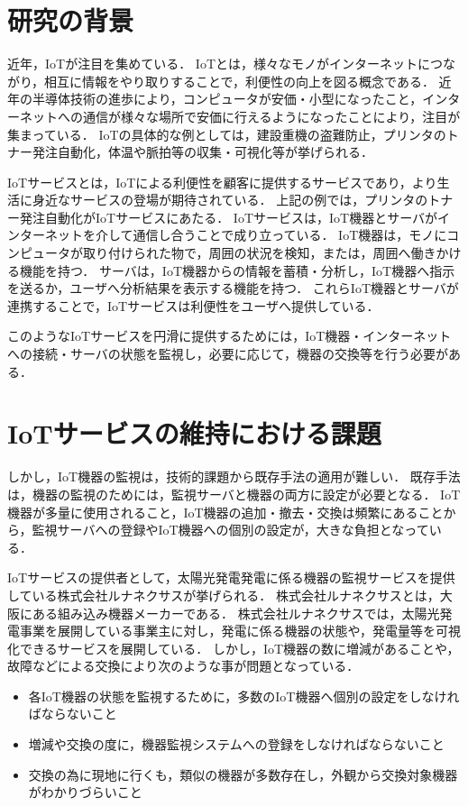 \section{研究の背景}
近年，IoTが注目を集めている．
IoTとは，様々なモノがインターネットにつながり，相互に情報をやり取りすることで，利便性の向上を図る概念である．
近年の半導体技術の進歩により，コンピュータが安価・小型になったこと，インターネットへの通信が様々な場所で安価に行えるようになったことにより，注目が集まっている．
IoTの具体的な例としては，建設重機の盗難防止，プリンタのトナー発注自動化，体温や脈拍等の収集・可視化等が挙げられる．
\medskip

IoTサービスとは，IoTによる利便性を顧客に提供するサービスであり，より生活に身近なサービスの登場が期待されている．
上記の例では，プリンタのトナー発注自動化がIoTサービスにあたる．
IoTサービスは，IoT機器とサーバがインターネットを介して通信し合うことで成り立っている．
IoT機器は，モノにコンピュータが取り付けられた物で，周囲の状況を検知，または，周囲へ働きかける機能を持つ．
サーバは，IoT機器からの情報を蓄積・分析し，IoT機器へ指示を送るか，ユーザへ分析結果を表示する機能を持つ．
これらIoT機器とサーバが連携することで，IoTサービスは利便性をユーザへ提供している．
\medskip

このようなIoTサービスを円滑に提供するためには，IoT機器・インターネットへの接続・サーバの状態を監視し，必要に応じて，機器の交換等を行う必要がある．

\section{IoTサービスの維持における課題}
しかし，IoT機器の監視は，技術的課題から既存手法の適用が難しい．
既存手法は，機器の監視のためには，監視サーバと機器の両方に設定が必要となる．
IoT機器が多量に使用されること，IoT機器の追加・撤去・交換は頻繁にあることから，監視サーバへの登録やIoT機器への個別の設定が，大きな負担となっている．
\medskip

IoTサービスの提供者として，太陽光発電発電に係る機器の監視サービスを提供している株式会社ルナネクサスが挙げられる．
株式会社ルナネクサスとは，大阪にある組み込み機器メーカーである．
株式会社ルナネクサスでは，太陽光発電事業を展開している事業主に対し，発電に係る機器の状態や，発電量等を可視化できるサービスを展開している．
しかし，IoT機器の数に増減があることや，故障などによる交換により次のような事が問題となっている．
\begin{itemize}
\item 各IoT機器の状態を監視するために，多数のIoT機器へ個別の設定をしなければならないこと
\item 増減や交換の度に，機器監視システムへの登録をしなければならないこと
\item 交換の為に現地に行くも，類似の機器が多数存在し，外観から交換対象機器がわかりづらいこと
\end{itemize}

